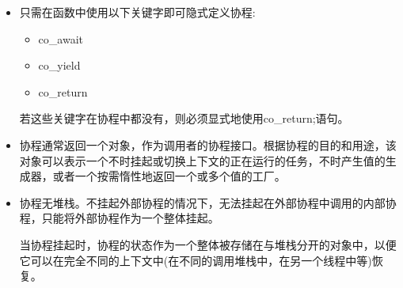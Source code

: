 \begin{itemize}
\item
只需在函数中使用以下关键字即可隐式定义协程:

\begin{itemize}
\item
co\_await

\item
co\_yield

\item
co\_return
\end{itemize}

若这些关键字在协程中都没有，则必须显式地使用co\_return;语句。

\item
协程通常返回一个对象，作为调用者的协程接口。根据协程的目的和用途，该对象可以表示一个不时挂起或切换上下文的正在运行的任务，不时产生值的生成器，或者一个按需惰性地返回一个或多个值的工厂。

\item
协程无堆栈。不挂起外部协程的情况下，无法挂起在外部协程中调用的内部协程，只能将外部协程作为一个整体挂起。

当协程挂起时，协程的状态作为一个整体被存储在与堆栈分开的对象中，以便它可以在完全不同的上下文中(在不同的调用堆栈中，在另一个线程中等)恢复。
\end{itemize}












